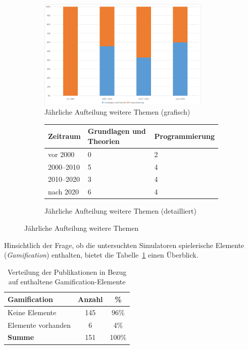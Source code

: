 \begin{figure}[!htbp]
    \centering
    \begin{subfigure}[b]{0.48\textwidth}
        \centering
        \includegraphics[width=0.90\textwidth]{graphics/5-top5-themen-jahr.png}
        \caption{Jährliche Aufteilung weitere Themen (grafisch)}
        \label{fig:5-top5-themen}
    \end{subfigure}
    \hfill
    \begin{subfigure}[b]{0.48\textwidth}
        \centering
        \tiny
        \begin{tabularx}{\textwidth}{lXX}
            \hline
            \textbf{Zeitraum} & \textbf{Grundlagen und Theorien} & \textbf{Programmierung} \\
            \hline
            vor 2000      & 0 & 2 \\
            2000--2010    & 5 & 4 \\
            2010--2020    & 3 & 4 \\
            nach 2020     & 6 & 4 \\
            \hline
        \end{tabularx}
        \caption{Jährliche Aufteilung weitere Themen (detailliert)}
        \label{tab:themen-zeit-2}
    \end{subfigure}
    \caption{Jährliche Aufteilung weitere Themen}
    \label{fig:pub-typen}
\end{figure}

Hinsichtlich der Frage, ob die untersuchten Simulatoren spielerische Elemente (\textit{Gamification}) enthalten, bietet die Tabelle~\ref{tab:gamification} einen Überblick.

\begin{table}[!htbp]
    \centering
    \tiny
    \begin{tabular}{l c c}
        \hline
        \textbf{Gamification} & \textbf{Anzahl} & \textbf{\%} \\
        \hline
        Keine Elemente     & 145 & 96\% \\
        Elemente vorhanden & 6   & 4\%  \\
        \hline
        \textbf{Summe}     & 151 & 100\% \\
        \hline
    \end{tabular}
    \caption{Verteilung der Publikationen in Bezug auf enthaltene Gamification-Elemente}
    \label{tab:gamification}
\end{table}

